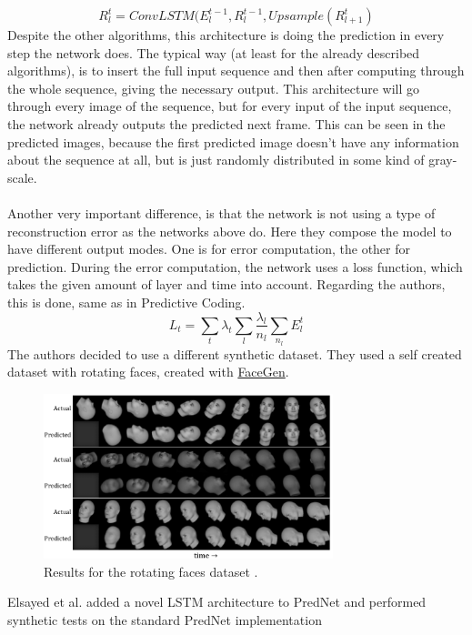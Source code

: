   \begin{equation}
   R_l^t = ConvLSTM(E_l^{t-1}, R_l^{t-1}, Upsample(R_{l+1}^t)
  \end{equation}\noindent
 Despite the other algorithms, this architecture is doing the prediction in every step the network does. The typical way (at least for the already described 
 algorithms), is to insert the full input sequence and then after computing through the whole sequence, giving the necessary output. This architecture will go
 through every image of the sequence, but for every input of the input sequence, the network already outputs the predicted next frame. This can be seen in the
 predicted images, because the first predicted image doesn't have any information about the sequence at all, but is just randomly distributed in some
 kind of gray-scale.
 \\\\
 Another very important difference, is that the network is not using a type of reconstruction error as the networks above do. Here they compose the model to
 have different output modes. One is for error computation, the other for prediction. During the error computation, the network uses a loss function, which takes
 the given amount of layer and time into account. Regarding the authors, this is done, same as in Predictive Coding.
 \begin{equation}
  L_t = \sum_{t}\lambda_t \sum_l \frac{\lambda_l}{n_l} \sum_{n_l}E_l^t
 \end{equation}
 The authors decided to use a different synthetic dataset. They used a self created dataset with rotating faces, created with \href{https://facegen.com/}
 {FaceGen}.
 \begin{figure}[H]
   \includegraphics[width=0.75\textwidth]{../Images/prednet.png}
   \centering
   \caption{Results for the rotating faces dataset \cite{Lotter2016}.}
   \label{fig:lotter_rotation}
 \end{figure}\noindent
 Elsayed et al. \cite{Elsayed2018} added a novel LSTM architecture to PredNet and performed synthetic tests on the standard PredNet implementation
